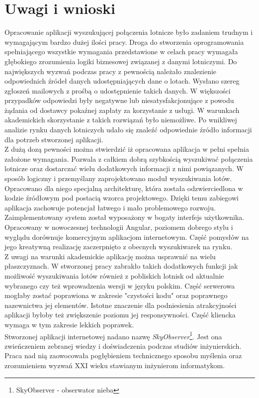 \documentclass[12pt, twoside]{report}
\begin{document}
\chapter{Uwagi i wnioski}
Opracowanie aplikacji wyszukującej połączenia lotnicze było zadaniem trudnym i wymagającym bardzo dużej ilości pracy. Droga do stworzenia oprogramowania spełniającego wszystkie wymagania przedstawione w celach pracy wymagała głębokiego zrozumienia logiki biznesowej związanej z danymi lotniczymi. Do największych wyzwań podczas pracy z pewnością należało znalezienie odpowiednich źródeł danych udostępniających dane o lotach. Wysłano szereg zgłoszeń mailowych z prośbą o udostępnienie takich danych. W większości przypadków odpowiedzi były negatywne lub niesatysfakcjonujące z powodu żądania od dostawcy pokaźnej zapłaty za korzystanie z usługi. W warunkach akademickich skorzystanie z takich rozwiązań było niemożliwe. Po wnikliwej analizie rynku danych lotniczych udało się znaleźć odpowiednie źródło informacji dla potrzeb stworzonej aplikacji. \\ \indent
 Z dużą dozą pewności można stwierdzić iż opracowana aplikacja w pełni spełnia założone wymagania. Pozwala z całkiem dobrą szybkością wyszukiwać połączenia lotnicze oraz dostarczać wielu dodatkowych informacji z nimi powiązanych. W sposób logiczny i przemyślany zaprojektowano moduł wyszukiwania lotów. Opracowano dla niego specjalną architekturę, która została odzwierciedlona w kodzie źródłowym pod postacią wzorca projektowego. Dzięki temu zabiegowi aplikacja zachowuje potencjał łatwego i mało problemowego rozwoju. \\ \indent
Zaimplementowany system został wyposażony w bogaty interfejs użytkownika. Opracowany w nowoczesnej technologii Angular, poziomem dobrego stylu i wyglądu dorównuje komercyjnym aplikacjom internetowym. Część pomysłów na jego kreatywną realizację zaczerpnięto z obecnych wyszukiwarek na rynku. \\ \indent
Z uwagi na warunki akademickie aplikację można usprawnić na wielu płaszczyznach. W stworzonej pracy zabrakło takich dodatkowych funkcji jak możliwość wyszukiwania lotów również z pobliskich lotnisk od aktualnie wybranego czy też wprowadzenia wersji w języku polskim. Część serwerowa mogłaby zostać poprawiona w zakresie "czystości kodu" oraz poprawnego nazewnictwa jej elementów. Istotne znaczenie dla podniesienia atrakcyjności aplikacji byłoby też zwiększenie poziomu jej responsywności. Część kliencka wymaga w tym zakresie lekkich poprawek. \\ \indent
Stworzonej aplikacji internetowej nadano nazwę \textit{SkyObserver}\footnote{SkyObserver - obserwator nieba}. Jest ona zwieńczeniem zebranej wiedzy i doświadczenia podczas studiów inżynierskich. Praca nad nią zaowocowała pogłębieniem technicznego sposobu myślenia oraz zrozumieniem wyzwań XXI wieku stawianym inżynierom informatykom.
\end{document}
